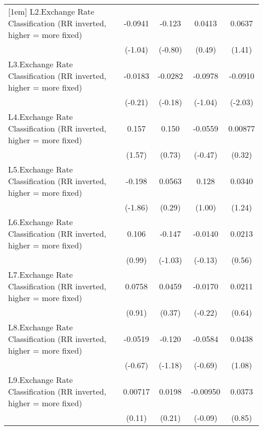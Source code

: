{\begin{tabular}{l*{4}{c}}
[1em]
L2.Exchange Rate Classification (RR inverted, higher = more fixed)&  -0.0941         &   -0.123         &   0.0413         &   0.0637         \\
                &  (-1.04)         &  (-0.80)         &   (0.49)         &   (1.41)         \\
[1em]
L3.Exchange Rate Classification (RR inverted, higher = more fixed)&  -0.0183         &  -0.0282         &  -0.0978         &  -0.0910\sym{*}  \\
                &  (-0.21)         &  (-0.18)         &  (-1.04)         &  (-2.03)         \\
[1em]
L4.Exchange Rate Classification (RR inverted, higher = more fixed)&    0.157         &    0.150         &  -0.0559         &  0.00877         \\
                &   (1.57)         &   (0.73)         &  (-0.47)         &   (0.32)         \\
[1em]
L5.Exchange Rate Classification (RR inverted, higher = more fixed)&   -0.198         &   0.0563         &    0.128         &   0.0340         \\
                &  (-1.86)         &   (0.29)         &   (1.00)         &   (1.24)         \\
[1em]
L6.Exchange Rate Classification (RR inverted, higher = more fixed)&    0.106         &   -0.147         &  -0.0140         &   0.0213         \\
                &   (0.99)         &  (-1.03)         &  (-0.13)         &   (0.56)         \\
[1em]
L7.Exchange Rate Classification (RR inverted, higher = more fixed)&   0.0758         &   0.0459         &  -0.0170         &   0.0211         \\
                &   (0.91)         &   (0.37)         &  (-0.22)         &   (0.64)         \\
[1em]
L8.Exchange Rate Classification (RR inverted, higher = more fixed)&  -0.0519         &   -0.120         &  -0.0584         &   0.0438         \\
                &  (-0.67)         &  (-1.18)         &  (-0.69)         &   (1.08)         \\
[1em]
L9.Exchange Rate Classification (RR inverted, higher = more fixed)&  0.00717         &   0.0198         & -0.00950         &   0.0373         \\
                &   (0.11)         &   (0.21)         &  (-0.09)         &   (0.85)         \\

\end{tabular}}
